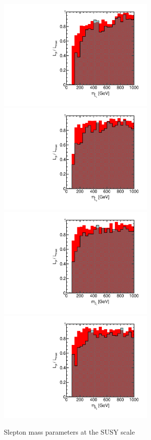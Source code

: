\begin{figure}[htbp]
\begin{center}
\includegraphics[height=5.5cm]{figs/fig_m_L_L.pdf} 
\includegraphics[height=5.5cm]{figs/fig_m_L_3.pdf} \\
\includegraphics[height=5.5cm]{figs/fig_m_e_1.pdf}
\includegraphics[height=5.5cm]{figs/fig_m_e_3.pdf}
\caption{Slepton mass parameters at the SUSY scale}
\label{default}
\end{center}
\end{figure}


